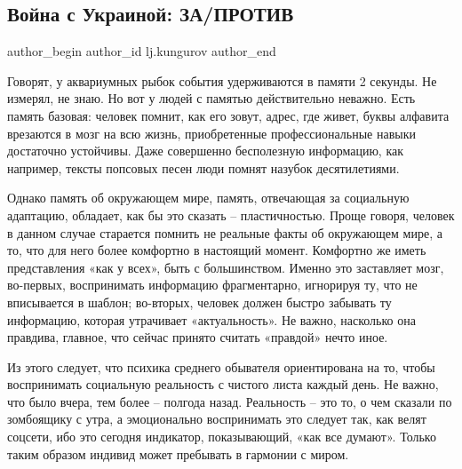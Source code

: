  
 
 
 
 
\subsection{Война с Украиной: ЗА/ПРОТИВ}
\label{sec:30_11_2021.lj.kungurov.1.rossia_napadenie}

\ifcmt
 author_begin
   author_id lj.kungurov
 author_end
\fi

Говорят, у аквариумных рыбок события удерживаются в памяти 2 секунды. Не
измерял, не знаю. Но вот у людей с памятью действительно неважно. Есть память
базовая: человек помнит, как его зовут, адрес, где живет, буквы алфавита
врезаются в мозг на всю жизнь, приобретенные профессиональные навыки достаточно
устойчивы. Даже совершенно бесполезную информацию, как например, тексты
попсовых песен люди помнят назубок десятилетиями.


Однако память об окружающем мире, память, отвечающая за социальную адаптацию,
обладает, как бы это сказать – пластичностью. Проще говоря, человек в данном
случае старается помнить не реальные факты об окружающем мире, а то, что для
него более комфортно в настоящий момент. Комфортно же иметь представления «как
у всех», быть с большинством. Именно это заставляет мозг, во-первых,
воспринимать информацию фрагментарно, игнорируя ту, что не вписывается в
шаблон; во-вторых, человек должен быстро забывать ту информацию, которая
утрачивает «актуальность». Не важно, насколько она правдива, главное, что
сейчас принято считать «правдой» нечто иное.

Из этого следует, что психика среднего обывателя ориентирована на то, чтобы
воспринимать социальную реальность с чистого листа каждый день. Не важно, что
было вчера, тем более – полгода назад. Реальность – это то, о чем сказали по
зомбоящику с утра, а эмоционально воспринимать это следует так, как велят
соцсети, ибо это сегодня индикатор, показывающий, «как все думают». Только
таким образом индивид может пребывать в гармонии с миром.

